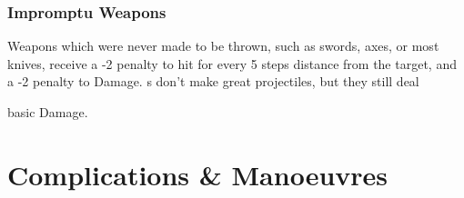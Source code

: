 \begin{multicols}{2}
\subsubsection{Impromptu Weapons}

Weapons which were never made to be thrown, such as swords, axes, or most knives, receive a -2 penalty to hit for every 5 steps distance from the target, and a -2 penalty to Damage.
\longsword s don't make great projectiles, but they still deal
\addtocounter{damage}{2} 
basic Damage.

\end{multicols}

\startcontents[Manoeuvres]

\section{Complications \& Manoeuvres}

